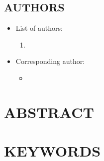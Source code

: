 \documentclass[12pt,english]{article}
\begin{document}
\subsection*{AUTHORS}
\begin{itemize}[label={}, leftmargin=*]
    \item List of authors:
    \begin{enumerate}
        \item \AUTHORHADAHINFO
    \end{enumerate}
    \item Corresponding author:
    \begin{itemize}
        \item \textbf{\AUTHORHADAHINFO}
    \end{itemize}
\end{itemize}




\clearpage 

\doublespacing
\section*{ABSTRACT}
\PAPERABSTRACT
\clearpage 

\doublespacing
\section*{KEYWORDS}
\PAPERKEYWORDS
\clearpage 
\end{document}
